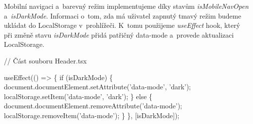 Mobilní navigaci a~barevný režim implementujeme díky stavům \emph{isMobileNavOpen} a~\emph{isDarkMode}. Informaci o~tom, zda má uživatel zapnutý tmavý režim budeme ukládat do LocalStorage v~prohlížeči. 
K~tomu použijeme \emph{useEffect} hook, který při změně stavu \emph{isDarkMode} přidá patřičný data-mode a~provede aktualizaci LocalStorage.

\begin{prog}
// Část souboru Header.tsx

useEffect(() => \{
  if (isDarkMode) \{
    document.documentElement.setAttribute('data-mode', 'dark');
    localStorage.setItem('data-mode', 'dark');
  \} else \{
    document.documentElement.removeAttribute('data-mode');
    localStorage.removeItem('data-mode');
  \}
\}, [isDarkMode]);
\end{prog}